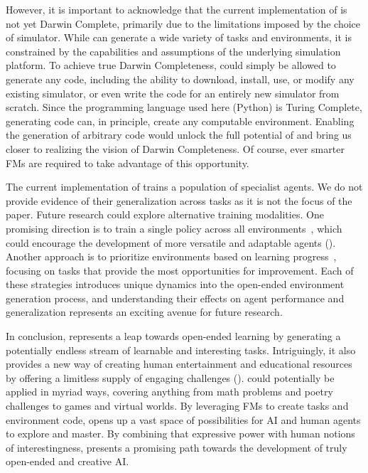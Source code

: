 \documentclass{article} %
\begin{document}
However, it is important to acknowledge that the current implementation of \ours{} is not yet Darwin Complete, primarily due to the limitations imposed by the choice of simulator. While \ours{} can generate a wide variety of tasks and environments, it is constrained by the capabilities and assumptions of the underlying simulation platform. To achieve true Darwin Completeness, \ours{} could simply be allowed to generate any code, including the ability to download, install, use, or modify any existing simulator, or even write the code for an entirely new simulator from scratch.
Since the programming language used here (Python) is Turing Complete, generating code can, in principle, create any computable environment.
Enabling the generation of arbitrary code would unlock the full potential of \ours{} and bring us closer to realizing the vision of Darwin Completeness. Of course, ever smarter FMs are required to take advantage of this opportunity.

The current implementation of \ours{} trains a population of specialist agents. We do not provide evidence of their generalization across tasks as it is not the focus of the paper. Future research could explore alternative training modalities. One promising direction is to train a single policy across all environments~\citep{bauer_HumanTimescaleAdaptationOpenEnded_2023}, which could encourage the development of more versatile and adaptable agents (). Another approach is to prioritize environments based on learning progress~\citep{baranes2013active, kanitscheider2021multi}, focusing on tasks that provide the most opportunities for improvement. Each of these strategies introduces unique dynamics into the open-ended environment generation process, and understanding their effects on agent performance and generalization represents an exciting avenue for future research.

In conclusion, \ours{} represents a leap towards open-ended learning by generating a potentially endless stream of learnable and interesting tasks. Intriguingly, it also provides a new way of creating human entertainment and educational resources by offering a limitless supply of engaging challenges (). \ours{} could potentially be applied in myriad ways, covering anything from math problems and poetry challenges to games and virtual worlds. By leveraging FMs to create tasks and environment code, \ours{} opens up a vast space of possibilities for AI and human agents to explore and master. By combining that expressive power with human notions of interestingness, \ours{} presents a promising path towards the development of truly open-ended and creative AI.
\end{document}

